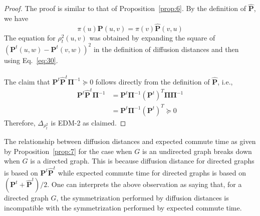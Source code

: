 \documentclass[10pt,twocolumn]{article}
\numberwithin{equation}{section}
\begin{document}
\begin{proof}
  The proof is similar to that of Proposition~\ref{prop:6}. By the
  definition of $\hat{\mathbf{P}}$, we have
  \begin{equation}
    \label{eq:30}
    \pi(u) \mathbf{P}(u,v) = \pi(v) \hat{\mathbf{P}}(v,u)
  \end{equation}
  The equation for $\rho_{t}^{2}(u,v)$ was obtained by expanding the
  square of $(\mathbf{P}^{t}(u,w) - \mathbf{P}^{t}(v,w))^{2}$ in the
  definition
  of diffusion distances and then using Eq.~\eqref{eq:30}. \\ \\
  \noindent The claim that
  $\mathbf{P}^{t}\hat{\mathbf{P}}^{t}\bm{\Pi}^{-1} \succeq 0$ follows
  directly from the definition of $\hat{\mathbf{P}}$, i.e.,
  \begin{equation*}
    \begin{split}
      \mathbf{P}^{t}\hat{\mathbf{P}}^{t}\bm{\Pi}^{-1} &= 
      \mathbf{P}^{t}\bm{\Pi}^{-1}(\mathbf{P}^{t})^{T}\bm{\Pi}\bm{\Pi}^{-1}
      \\
      & = \mathbf{P}^{t}\bm{\Pi}^{-1}(\mathbf{P}^{t})^{T} \succeq 0
    \end{split}
  \end{equation*}
 Therefore, $\Delta_{\rho_{t}^2}$ is EDM-2 as claimed.
\end{proof}
The relationship between diffusion distances and expected commute time
as given by Proposition~\ref{prop:7} for the case when $G$ is an
undirected graph breaks down when $G$ is a directed graph. This is
because diffusion distance for directed graphs is based on
$\mathbf{P}^{t}\hat{\mathbf{P}}^{t}$ while expected commute time for
directed graphs is based on $(\mathbf{P}^{t} +
\hat{\mathbf{P}}^{t})/2$. One can interprets the above observation
as saying that, for a directed graph $G$, the symmetrization performed by
diffusion distances is incompatible with the symmetrization performed
by expected commute time.
\end{document}
